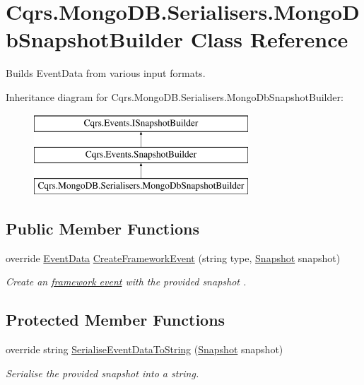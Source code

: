 \hypertarget{classCqrs_1_1MongoDB_1_1Serialisers_1_1MongoDbSnapshotBuilder}{}\section{Cqrs.\+Mongo\+D\+B.\+Serialisers.\+Mongo\+Db\+Snapshot\+Builder Class Reference}
\label{classCqrs_1_1MongoDB_1_1Serialisers_1_1MongoDbSnapshotBuilder}


Builds Event\+Data from various input formats.  


Inheritance diagram for Cqrs.\+Mongo\+D\+B.\+Serialisers.\+Mongo\+Db\+Snapshot\+Builder\+:\begin{figure}[H]
\begin{center}
\leavevmode
\includegraphics[height=3.000000cm]{classCqrs_1_1MongoDB_1_1Serialisers_1_1MongoDbSnapshotBuilder}
\end{center}
\end{figure}
\subsection*{Public Member Functions}
\begin{DoxyCompactItemize}
\item 
override \hyperlink{classCqrs_1_1Events_1_1EventData}{Event\+Data} \hyperlink{classCqrs_1_1MongoDB_1_1Serialisers_1_1MongoDbSnapshotBuilder_ae05840d11ff5c3aa710b89bfbff1688b_ae05840d11ff5c3aa710b89bfbff1688b}{Create\+Framework\+Event} (string type, \hyperlink{classCqrs_1_1Snapshots_1_1Snapshot}{Snapshot} snapshot)
\begin{DoxyCompactList}\small\item\em Create an \hyperlink{}{framework event} with the provided {\itshape snapshot} . \end{DoxyCompactList}\end{DoxyCompactItemize}
\subsection*{Protected Member Functions}
\begin{DoxyCompactItemize}
\item 
override string \hyperlink{classCqrs_1_1MongoDB_1_1Serialisers_1_1MongoDbSnapshotBuilder_a47770b61682197c725848255fc0e703f_a47770b61682197c725848255fc0e703f}{Serialise\+Event\+Data\+To\+String} (\hyperlink{classCqrs_1_1Snapshots_1_1Snapshot}{Snapshot} snapshot)
\begin{DoxyCompactList}\small\item\em Serialise the provided {\itshape snapshot}  into a string. \end{DoxyCompactList}\end{DoxyCompactItemize}


